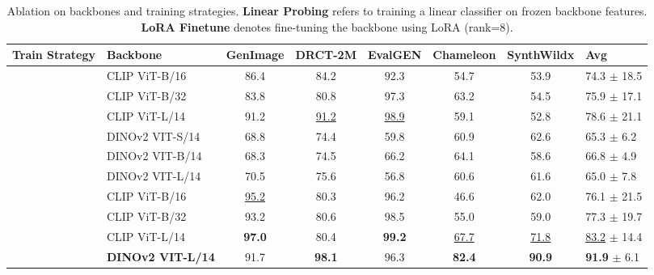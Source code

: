 \documentclass{article}
\begin{document}
\begin{table}[tb!]
\centering
\caption{Ablation on backbones and training strategies. \textbf{Linear Probing} refers to training a linear classifier on frozen backbone features. \textbf{LoRA Finetune} denotes fine-tuning the backbone using LoRA (rank=8). }
\label{tab:backbone}
\begin{adjustbox}{width=1.0\linewidth}
\begin{tabular}{clcccccl}
\toprule
Train Strategy & Backbone & GenImage & DRCT-2M & EvalGEN & Chameleon & SynthWildx & Avg \\
\midrule
{} & CLIP ViT-B/16 & 86.4 & 84.2 & 92.3 & 54.7 & 53.9 & 74.3 $\pm$ 18.5 \\
& CLIP ViT-B/32 & 83.8 & 80.8 & 97.3 & 63.2 & 54.5 & 75.9 $\pm$ 17.1 \\
& CLIP ViT-L/14 & 91.2 & \underline{91.2} & \underline{98.9} & 59.1 & 52.8 & 78.6 $\pm$ 21.1 \\
& DINOv2 VIT-S/14 & 68.8 & 74.4 & 59.8 & 60.9 & 62.6 & 65.3 $\pm$ 6.2 \\
& DINOv2 VIT-B/14 & 68.3 & 74.5 & 66.2 & 64.1 & 58.6 & 66.8 $\pm$ 4.9 \\
& DINOv2 VIT-L/14 & 70.5 & 75.6 & 56.8 & 60.6 & 61.6 & 65.0 $\pm$ 7.8 \\
\midrule
{} & CLIP ViT-B/16 & \underline{95.2} & 80.3 & 96.2 & 46.6 & 62.0 & 76.1 $\pm$ 21.5 \\
& CLIP ViT-B/32 & 93.2 & 80.6 & 98.5 & 55.0 & 59.0 & 77.3 $\pm$ 19.7 \\
& CLIP ViT-L/14 & \textbf{97.0} & 80.4 & \textbf{99.2} & \underline{67.7} & \underline{71.8} & \underline{83.2} $\pm$ 14.4 \\
 & \textbf{DINOv2 VIT-L/14} & 91.7 & \textbf{98.1} & 96.3 & \textbf{82.4} & \textbf{90.9} & \textbf{91.9} $\pm$ 6.1 \\
\bottomrule
\end{tabular}
\end{adjustbox}
\vspace{0pt}
\end{table}
\end{document}
